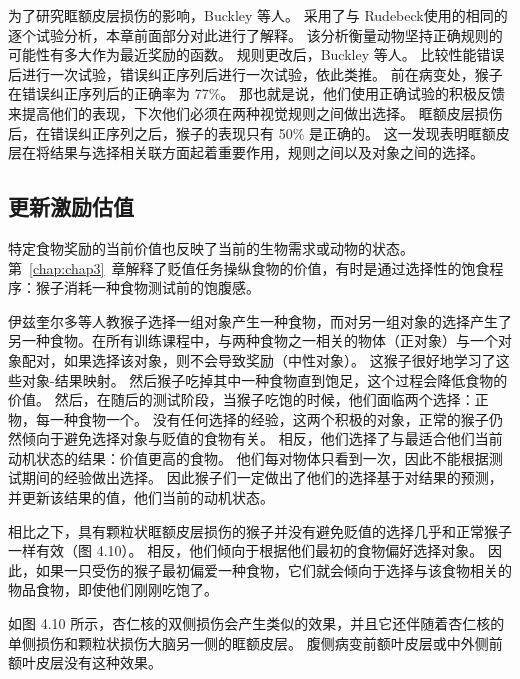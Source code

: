 为了研究眶额皮层损伤的影响，Buckley 等人。
采用了与 Rudebeck\cite{rudebeck2008frontal}使用的相同的逐个试验分析，本章前面部分对此进行了解释。
该分析衡量动物坚持正确规则的可能性有多大作为最近奖励的函数。
规则更改后，Buckley 等人。
比较性能错误后进行一次试验，错误纠正序列后进行一次试验，依此类推。
前在病变处，猴子在错误纠正序列后的正确率为 77\%。
那也就是说，他们使用正确试验的积极反馈来提高他们的表现，下次他们必须在两种视觉规则之间做出选择。
眶额皮层损伤后，在错误纠正序列之后，猴子的表现只有 50\% 是正确的。
这一发现表明眶额皮层在将结果与选择相关联方面起着重要作用，规则之间以及对象之间的选择。\par



\subsection{更新激励估值}

特定食物奖励的当前价值也反映了当前的生物需求或动物的状态。
第~\ref{chap:chap3}~章解释了贬值任务操纵食物的价值，有时是通过选择性的饱食程序：猴子消耗一种食物测试前的饱腹感。\par


伊兹奎尔多等人\cite{izquierdo2004bilateral}教猴子选择一组对象产生一种食物，而对另一组对象的选择产生了另一种食物。在所有训练课程中，与两种食物之一相关的物体（正对象）与一个对象配对，如果选择该对象，则不会导致奖励（中性对象）。
这猴子很好地学习了这些对象-结果映射。
然后猴子吃掉其中一种食物直到饱足，这个过程会降低食物的价值。
然后，在随后的测试阶段，当猴子吃饱的时候，他们面临两个选择：正物，每一种食物一个。
没有任何选择的经验，这两个积极的对象，正常的猴子仍然倾向于避免选择对象与贬值的食物有关。
相反，他们选择了与最适合他们当前动机状态的结果：价值更高的食物。
他们每对物体只看到一次，因此不能根据测试期间的经验做出选择。
因此猴子们一定做出了他们的选择基于对结果的预测，并更新该结果的值，他们当前的动机状态。\par


相比之下，具有颗粒状眶额皮层损伤的猴子并没有避免贬值的选择几乎和正常猴子一样有效（图 4.10）。
相反，他们倾向于根据他们最初的食物偏好选择对象。
因此，如果一只受伤的猴子最初偏爱一种食物，它们就会倾向于选择与该食物相关的物品食物，即使他们刚刚吃饱了。\par


如图 4.10 所示，杏仁核的双侧损伤会产生类似的效果，并且它还伴随着杏仁核的单侧损伤和颗粒状损伤大脑另一侧的眶额皮层\cite{baxter2000control}。
腹侧病变前额叶皮层或中外侧前额叶皮层没有这种效果\cite{baxter2009ventrolateral}。\par


